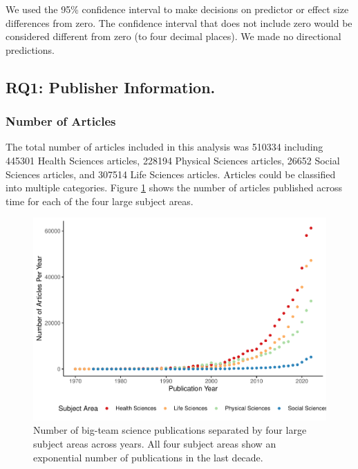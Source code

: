 \documentclass[
  man,mask,floatsintext]{apa7}
\begin{document}
We used the 95\% confidence interval to make decisions on predictor or
effect size differences from zero. The confidence interval that does not
include zero would be considered different from zero (to four decimal
places). We made no directional predictions.

\hypertarget{rq1-publisher-information.}{%
\subsection{RQ1: Publisher Information.}\label{rq1-publisher-information.}}

\hypertarget{number-of-articles}{%
\subsubsection{Number of Articles}\label{number-of-articles}}

The total number of articles included in this
analysis was 510334 including 445301 Health Sciences
articles, 228194 Physical Sciences articles, 26652
Social Sciences articles, and 307514 Life Sciences articles.
Articles could be classified into multiple categories. Figure
\ref{fig:fig-pub-time} shows the number of articles published across
time for each of the four large subject areas.

\begin{figure}
\centering
\includegraphics{manuscript_scopus_files/figure-latex/fig-pub-time-1.pdf}
\caption{\label{fig:fig-pub-time}Number of big-team science publications separated by four large subject areas across years. All four subject areas show an exponential number of publications in the last decade.}
\end{figure}
\end{document}
